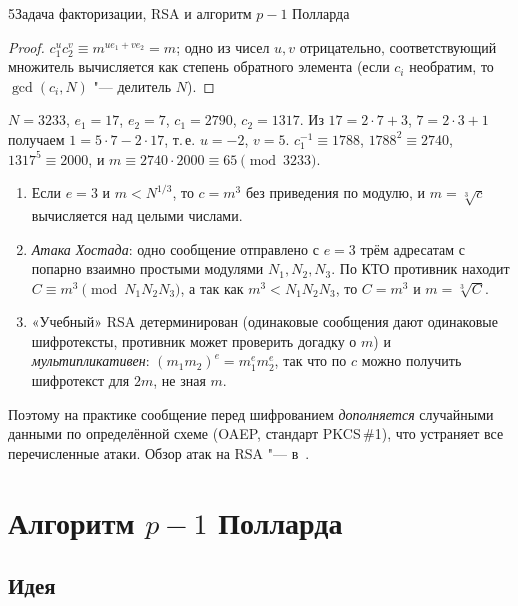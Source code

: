 \begin{lecture}{5}{Задача факторизации, RSA и алгоритм \texorpdfstring{$p - 1$}{p - 1} Полларда}
\begin{proof}
$c_1^u c_2^v \equiv m^{u e_1 + v e_2} = m$; одно из чисел $u, v$ отрицательно, соответствующий
множитель вычисляется как степень обратного элемента (если $c_i$ необратим, то
$\gcd(c_i, N)$ "--- делитель $N$).
\end{proof}

\begin{example}
$N = 3233$, $e_1 = 17$, $e_2 = 7$, $c_1 = 2790$, $c_2 = 1317$. Из $17 = 2 \cdot 7 + 3$,
$7 = 2 \cdot 3 + 1$ получаем $1 = 5 \cdot 7 - 2 \cdot 17$, т.\,е. $u = -2$, $v = 5$.
$c_1^{-1} \equiv 1788$, $1788^2 \equiv 2740$, $1317^5 \equiv 2000$, и
$m \equiv 2740 \cdot 2000 \equiv 65 \pmod{3233}$.
\end{example}

\begin{remark}
\begin{enumerate}
  \item Если $e = 3$ и $m < N^{1/3}$, то $c = m^3$ без приведения по модулю, и $m = \sqrt[3]{c}$
    вычисляется над целыми числами.
  \item \emph{Атака Хостада}: одно сообщение отправлено с $e = 3$ трём адресатам с попарно
    взаимно простыми модулями $N_1, N_2, N_3$. По КТО противник находит
    $C \equiv m^3 \pmod{N_1 N_2 N_3}$, а так как $m^3 < N_1 N_2 N_3$, то $C = m^3$ и
    $m = \sqrt[3]{C}$.
  \item «Учебный» RSA детерминирован (одинаковые сообщения дают одинаковые шифротексты,
    противник может проверить догадку о $m$) и \emph{мультипликативен}:
    $(m_1 m_2)^e = m_1^e m_2^e$, так что по $c$ можно получить шифротекст для $2m$, не зная $m$.
\end{enumerate}
Поэтому на практике сообщение перед шифрованием \emph{дополняется} случайными данными по
определённой схеме (OAEP, стандарт PKCS\,\#1), что устраняет все перечисленные атаки.
Обзор атак на RSA "--- в~\cite{boneh-rsa-attacks}.
\end{remark}


\section{Алгоритм \texorpdfstring{$p - 1$}{p - 1} Полларда}

\subsection{Идея}


\end{lecture}

